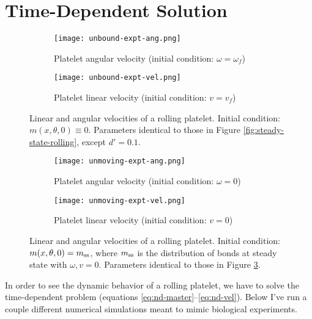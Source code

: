 \documentclass{article}
\newcommand{\tn}{\textnormal}
\begin{document}
\section{Time-Dependent Solution}
\label{sec:time-depend-solut}

\begin{figure}
  \centering
  \begin{subfigure}{0.45\textwidth}
    \texttt{[image: unbound-expt-ang.png]}
    \caption{Platelet angular velocity (initial condition: $\omega =
      \omega_f$)}
    \label{fig:unbound-expt-ang}
  \end{subfigure}
  \quad
  \begin{subfigure}{0.45\textwidth}
    \texttt{[image: unbound-expt-vel.png]}
    \caption{Platelet linear velocity (initial condition: $v = v_f$)}
    \label{fig:unbound-expt-vel}
  \end{subfigure}
  \caption{Linear and angular velocities of a rolling
    platelet. Initial condition: $m(x, \theta, 0) \equiv
    0$. Parameters identical to those in Figure
    \ref{fig:steady-state-rolling}, except $d' = 0.1$.}
  \label{fig:unbound-expt}
\end{figure}

\begin{figure}
  \centering
  \begin{subfigure}{0.45\textwidth}
    \texttt{[image: unmoving-expt-ang.png]}
    \caption{Platelet angular velocity (initial condition: $\omega =
      0$)}
    \label{fig:unmoving-expt-ang}
  \end{subfigure}
  \quad
  \begin{subfigure}{0.45\textwidth}
    \texttt{[image: unmoving-expt-vel.png]}
    \caption{Platelet linear velocity (initial condition: $v = 0$)}
    \label{fig:unmoving-expt-vel}
  \end{subfigure}
  \caption{Linear and angular velocities of a rolling
    platelet. Initial condition: $m(x, \theta, 0) =
    m_\tn{ss}$, where $m_\tn{ss}$ is the distribution of bonds at
    steady state with $\omega, v = 0$. Parameters identical to those
    in Figure \ref{fig:unbound-expt}.} 
  \label{fig:unmoving-expt}
\end{figure}

In order to see the dynamic behavior of a rolling platelet, we have to
solve the time-dependent problem (equations
\eqref{eq:nd-master}--\eqref{eq:nd-vel}). Below I've run a couple
different numerical simulations meant to mimic biological
experiments. 
\end{document}
